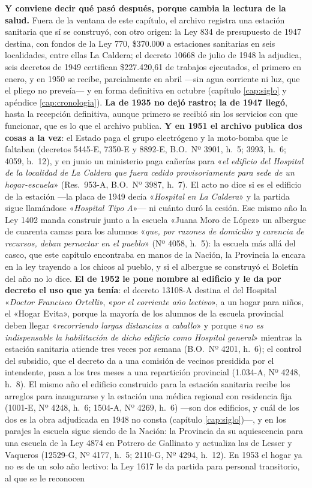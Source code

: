 \textbf{Y conviene decir qué pasó después, porque cambia la lectura de la salud.} Fuera de la
ventana de este capítulo, el archivo registra una estación sanitaria que sí se construyó, con otro
origen: la Ley 834 de presupuesto de 1947 destina, con fondos de la Ley 770, \$370.000 a estaciones
sanitarias en seis localidades, entre ellas La Caldera; el decreto 10668 de julio de 1948 la
adjudica, seis decretos de 1949 certifican \$227.420,61 de trabajos ejecutados, el primero en enero, y en 1950 se
recibe, parcialmente en abril ---sin agua corriente ni luz, que el pliego no preveía--- y en forma definitiva en octubre (capítulo \ref{cap:siglo} y apéndice
\ref{cap:cronologia}). \textbf{La de 1935 no dejó rastro; la de 1947 llegó}, hasta la recepción
definitiva, aunque primero se recibió sin los servicios con que funcionar, que es lo que el archivo publica. \textbf{Y en 1951 el archivo publica dos cosas a la vez}: el Estado paga el grupo electrógeno y la moto-bomba que le faltaban (decretos 5445-E, 7350-E y 8892-E, B.O.\ Nº 3901, h.\ 5; 3993, h.\ 6; 4059, h.\ 12), y en junio un ministerio paga cañerías para «\textit{el edificio del Hospital de la localidad de La Caldera que fuera cedido provisoriamente para sede de un hogar-escuela}» (Res.\ 953-A, B.O.\ Nº 3987, h.\ 7). El acto no dice si es el edificio de la estación ---la placa de 1949 decía «\textit{Hospital en La Caldera}» y la partida sigue llamándose «\textit{Hospital Tipo A}»--- ni cuánto duró la cesión. Ese mismo año la Ley 1402 manda construir junto a la escuela «Juana Moro de López» un albergue de cuarenta camas para los alumnos «\textit{que, por razones de domicilio y carencia de recursos, deban pernoctar en el pueblo}» (Nº 4058, h.\ 5): la escuela más allá del casco, que este capítulo encontraba en manos de la Nación, la Provincia la encara en la ley trayendo a los chicos al pueblo, y si el albergue se construyó el Boletín del año no lo dice. \textbf{El de 1952 le pone nombre al edificio y le da por decreto el uso que ya tenía}: el decreto 13108-A destina el del Hospital «\textit{Doctor Francisco Ortelli}», «\textit{por el corriente año lectivo}», a un hogar para niños, el «Hogar Evita», porque la mayoría de los alumnos de la escuela provincial deben llegar «\textit{recorriendo largas distancias a caballo}» y porque «\textit{no es indispensable la habilitación de dicho edificio como Hospital general}» mientras la estación sanitaria atiende tres veces por semana (B.O.\ Nº 4201, h.\ 6); el control del subsidio, que el decreto da a una comisión de vecinos presidida por el intendente, pasa a los tres meses a una repartición provincial (1.034-A, Nº 4248, h.\ 8). El mismo año el edificio construido para la estación sanitaria recibe los arreglos para inaugurarse y la estación una médica regional con residencia fija (1001-E, Nº 4248, h.\ 6; 1504-A, Nº 4269, h.\ 6) ---son dos edificios, y cuál de los dos es la obra adjudicada en 1948 no consta (capítulo \ref{cap:siglo})---, y en los parajes la escuela sigue siendo de la Nación: la Provincia da su aquiescencia para una escuela de la Ley 4874 en Potrero de Gallinato y actualiza las de Lesser y Vaqueros (12529-G, Nº 4177, h.\ 5; 2110-G, Nº 4294, h.\ 12). En 1953 el hogar ya no es de un solo año lectivo: la Ley 1617 le da partida para personal transitorio, al que se le reconocen 